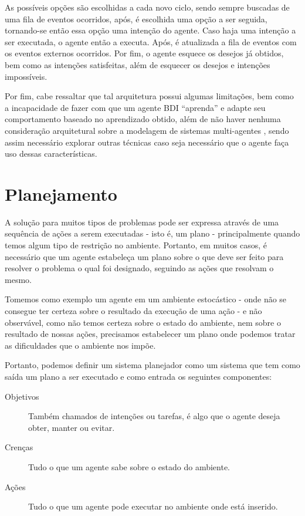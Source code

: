 As possíveis opções são escolhidas a cada novo ciclo, sendo sempre buscadas de
uma fila de eventos ocorridos, após, é escolhida uma opção a ser seguida,
tornando-se então essa opção uma intenção do agente. Caso haja uma intenção a
ser executada, o agente então a executa. Após, é atualizada a fila de eventos
com os eventos externos ocorridos. Por fim, o agente esquece os desejos já
obtidos, bem como as intenções satisfeitas, além de esquecer os desejos e
intenções impossíveis.

Por fim, cabe ressaltar que tal arquitetura possui algumas limitações, bem como
a incapacidade de fazer com que um agente BDI ``aprenda'' e adapte seu
comportamento baseado no aprendizado obtido, além de não haver nenhuma
consideração arquitetural sobre a modelagem de sistemas multi-agentes
\cite{BDIMODELOFAGENCY}, sendo assim necessário explorar outras técnicas caso
seja necessário que o agente faça uso dessas características.

\section{Planejamento}

A solução para muitos tipos de problemas pode ser expressa através de uma
sequência de ações a serem executadas - isto é, um plano - principalmente quando
temos algum tipo de restrição no ambiente. Portanto, em muitos casos, é
necessário que um agente estabeleça um plano sobre o que deve ser feito para
resolver o problema o qual foi designado, seguindo as ações que resolvam o
mesmo.

Tomemos como exemplo um agente em um ambiente estocástico - onde não se consegue
ter certeza sobre o resultado da execução de uma ação - e não observável, como
não temos certeza sobre o estado do ambiente, nem sobre o resultado de nossas
ações, precisamos estabelecer um plano onde podemos tratar as dificuldades que
o ambiente nos impõe.

Portanto, podemos definir um sistema planejador como um sistema que tem como
saída um plano a ser executado e como entrada os seguintes componentes:

\begin{description}
    \item [Objetivos]
        Também chamados de intenções ou tarefas, é algo que o agente deseja
        obter, manter ou evitar.
    \item [Crenças]
        Tudo o que um agente sabe sobre o estado do ambiente.
    \item [Ações]
        Tudo o que um agente pode executar no ambiente onde está inserido.
\end{description}\cite{Woolridge:2001:IMS:559667}

